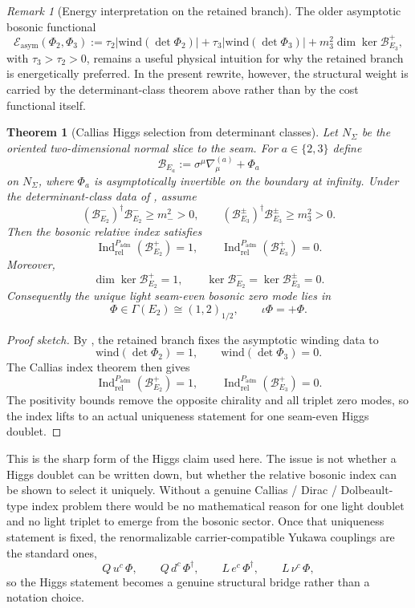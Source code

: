 \documentclass[11pt,a4paper]{article}
\newtheorem{theorem}{Theorem}[section]
\theoremstyle{definition}
\theoremstyle{remark}
\newtheorem*{remark}{Remark}
\DeclareMathOperator{\Ind}{Ind}
\newcommand{\Seam}{\Sigma}
\newcommand{\inv}{\iota}
\newcommand{\Padm}{P_{\mathrm{adm}}}
\begin{document}
\begin{remark}[Energy interpretation on the retained branch]
The older asymptotic bosonic functional
\[
\mathcal E_{\mathrm{asym}}(\Phi_2,\Phi_3)
:=
\tau_2\bigl|\mathrm{wind}(\det\Phi_2)\bigr|
+\tau_3\bigl|\mathrm{wind}(\det\Phi_3)\bigr|
+m_3^2\dim\ker\mathcal B_{E_3}^+,
\]
with $\tau_3>\tau_2>0$, remains a useful physical intuition for why the retained branch is energetically preferred. In the present rewrite, however, the structural weight is carried by the determinant-class theorem above rather than by the cost functional itself.
\end{remark}

\begin{theorem}[Callias Higgs selection from determinant classes]
\label{thm:callias-higgs-selection}
Let $N_\Seam$ be the oriented two-dimensional normal slice to the seam. For $a\in\{2,3\}$ define
\[
\mathcal B_{E_a}:=\sigma^\mu\nabla^{(a)}_\mu+\Phi_a
\]
on $N_\Seam$, where $\Phi_a$ is asymptotically invertible on the boundary at infinity. Under the determinant-class data of , assume
\[
(\mathcal B_{E_2}^-)^\dagger\mathcal B_{E_2}^-\ge m_-^2>0,
\qquad
(\mathcal B_{E_3}^{\pm})^\dagger\mathcal B_{E_3}^{\pm}\ge m_3^2>0.
\]
Then the bosonic relative index satisfies
\[
\Ind_{\mathrm{rel}}^{\Padm}(\mathcal B_{E_2}^+)=1,
\qquad
\Ind_{\mathrm{rel}}^{\Padm}(\mathcal B_{E_3}^+)=0.
\]
Moreover,
\[
\dim\ker\mathcal B_{E_2}^+=1,
\qquad
\ker\mathcal B_{E_2}^-=\ker\mathcal B_{E_3}^{\pm}=0.
\]
Consequently the unique light seam-even bosonic zero mode lies in
\[
\Phi\in\Gamma(E_2)\cong (1,2)_{1/2},
\qquad
\inv\Phi=+\Phi.
\]
\end{theorem}

\begin{proof}[Proof sketch]
By , the retained branch fixes the asymptotic winding data to
\[
\mathrm{wind}(\det\Phi_2)=1,
\qquad
\mathrm{wind}(\det\Phi_3)=0.
\]
The Callias index theorem then gives
\[
\Ind_{\mathrm{rel}}^{\Padm}(\mathcal B_{E_2}^+)=1,
\qquad
\Ind_{\mathrm{rel}}^{\Padm}(\mathcal B_{E_3}^+)=0.
\]
The positivity bounds remove the opposite chirality and all triplet zero modes, so the index lifts to an actual uniqueness statement for one seam-even Higgs doublet.
\end{proof}

This is the sharp form of the Higgs claim used here. The issue is not whether a Higgs doublet can be written down, but whether the relative bosonic index can be shown to select it uniquely.
Without a genuine Callias / Dirac / Dolbeault-type index problem there would be no mathematical reason for one light doublet and no light triplet to emerge from the bosonic sector. Once that uniqueness statement is fixed, the renormalizable carrier-compatible Yukawa couplings are the standard ones,
\[
Q\,u^c\,\Phi,
\qquad
Q\,d^c\,\Phi^\dagger,
\qquad
L\,e^c\,\Phi^\dagger,
\qquad
L\,\nu^c\,\Phi,
\]
so the Higgs statement becomes a genuine structural bridge rather than a notation choice.
\end{document}
